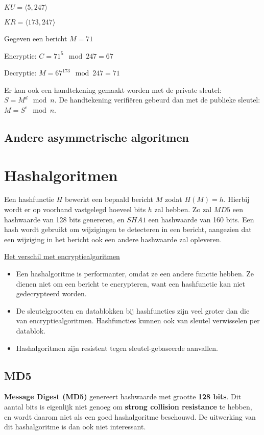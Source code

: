 \documentclass{report}
\begin{document}
	$KU = \langle 5, 247 \rangle$

	$KR = \langle 173, 247 \rangle$

	Gegeven een bericht $M = 71$

	Encryptie: $C = 71^5 \mod 247 = 67$

	Decryptie: $M = 67^{173} \mod 247 = 71$

	Er kan ook een handtekening gemaakt worden met de private sleutel: $S = M^{d} \mod n$. De handtekening verifiëren gebeurd dan met de publieke sleutel: $M = S^{e} \mod n$.

	\subsection{Andere asymmetrische algoritmen}
	\section{Hashalgoritmen}
	Een hashfunctie $H$ bewerkt een bepaald bericht $M$ zodat $H(M) = h$. Hierbij wordt er op voorhand vastgelegd hoeveel bits $h$ zal hebben. Zo zal $MD5$ een hashwaarde van 128 bits genereren, en $SHA1$ een hashwaarde van 160 bits. Een hash wordt gebruikt om wijzigingen te detecteren in een bericht, aangezien dat een wijziging in het bericht ook een andere hashwaarde zal opleveren.

	\underline{Het verschil met encryptiealgoritmen}
	\begin{itemize}
		\item[\info] Een hashalgoritme is performanter, omdat ze een andere functie hebben. Ze dienen niet om een bericht te encrypteren, want een hashfunctie kan niet gedecrypteerd worden.
		\item[\info] De sleutelgrootten en datablokken bij hashfuncties zijn veel groter dan die van encryptiealgoritmen. Hashfuncties kunnen ook van sleutel verwisselen per datablok.
		\item[\info] Hashalgoritmen zijn resistent tegen sleutel-gebaseerde aanvallen.
	\end{itemize}

	\subsection{MD5}
	\textbf{Message Digest (MD5)} genereert hashwaarde met grootte \textbf{128 bits}. Dit aantal bits is eigenlijk niet genoeg om \textbf{strong collision resistance} te hebben, en wordt daarom niet als een goed hashalgoritme beschouwd. De uitwerking van dit hashalgoritme is dan ook niet interessant.
\end{document}
